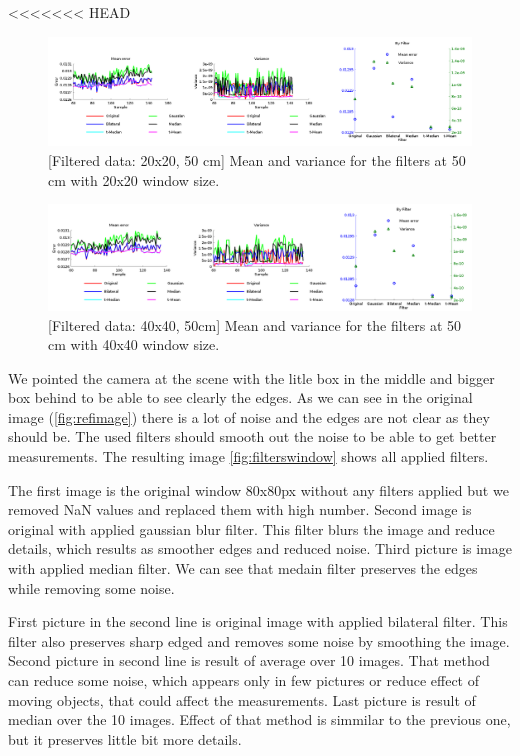 \documentclass[11pt]{article}
\begin{document}
<<<<<<< HEAD
\begin{figure}[ht]
  \centering
  \includegraphics[width=1\textwidth]{figures/plot20x20filtered.png}
  [Filtered data: 20x20, 50 cm]{\label{fig:plots20x20filtered} Mean and variance for the filters at 50 cm with 20x20 window size.}
\end{figure}
\begin{figure}[ht]
  \begin{center}
    \includegraphics[width=1\textwidth]{figures/plot40x40filtered.png}
    [Filtered data: 40x40, 50cm]{\label{fig:plots40x40filtered} Mean and variance for the filters at 50 cm
      with 40x40 window size.}
  \end{center}
  

\end{figure}
We pointed the camera at the scene with the litle box in the middle and bigger box behind to be able to see clearly the edges. As we can see in the original image (\vref{fig:refimage}) there is a lot of noise and the edges are not clear as they should be. The used filters should smooth out the noise to be able to get better measurements. The resulting image \vref{fig:filterswindow} shows all applied filters. \par
The first image is the original window 80x80px without any filters applied but we removed NaN values and replaced them with high number. Second image is original with applied gaussian blur filter. This filter blurs the image and reduce details, which results as smoother edges and reduced noise. Third picture is image with applied median filter. We can see that medain filter preserves the edges while removing some noise. \par
First picture in the second line is original image with applied bilateral filter. This filter also preserves sharp edged and removes some noise by smoothing the image. Second picture in second line is result of average over 10 images. That method can reduce some noise, which appears only in few pictures or reduce effect of moving objects, that could affect the measurements. Last picture is result of median over the 10 images. Effect of that method is simmilar to the previous one, but it preserves little bit more details. 
\end{document}
